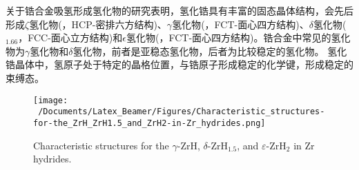 
关于锆合金吸氢形成氢化物的研究表明，氢化锆具有丰富的固态晶体结构，会先后形成$\zeta$氢化物\textrm{(，\textrm{HCP}-密排六方结构)}、$\gamma$氢化物\textrm{(，\textrm{FCT}-面心四方结构)}、$\delta$氢化物\textrm{($_{1.66}$，\textrm{FCC}-面心立方结构)}和$\epsilon$氢化物\textrm{(，\textrm{FCT}-面心四方结构)}。锆合金中常见的氢化物为$\gamma$氢化物和$\delta$氢化物，前者是亚稳态氢化物，后者为比较稳定的氢化物。%
氢化锆晶体中，氢原子处于特定的晶格位置，与锆原子形成稳定的化学键，形成稳定的束缚态。
\begin{figure}[!ht]
\centering
\vspace*{-0.05in}
\texttt{[image: ~/Documents/Latex\_Beamer/Figures/Characteristic\_structures-for-the\_ZrH\_ZrH1.5\_and\_ZrH2-in-Zr\_hydrides.png]}
\caption{\tiny \textrm{Characteristic structures for the $\gamma$-ZrH, $\delta$-$\mathrm{ZrH}_{1.5}$, and $\varepsilon$-$\mathrm{ZrH}_2$ in Zr hydrides.}}
\label{Fig:Characteristic_structures-for-the_𝛾-ZrH_𝛿-ZrH1.5_and_𝜀-ZrH2-in-Zr_hydrides}
\end{figure}


